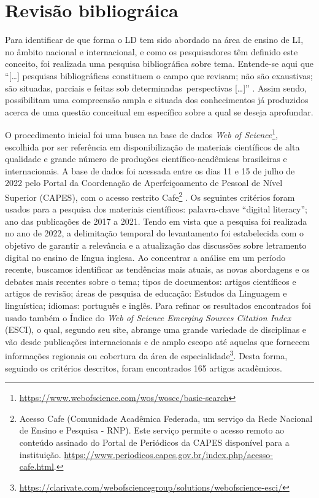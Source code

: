 \section{Revisão bibliográica}\label{sec-revisãobibliográfica}

Para identificar de que forma o LD tem sido abordado na área de ensino
de LI, no âmbito nacional e internacional, e como os pesquisadores têm
definido este conceito, foi realizada uma pesquisa bibliográfica sobre
tema. Entende-se aqui que ``{[}\ldots{]} pesquisas bibliográficas
constituem o campo que revisam; não são exaustivas; são situadas,
parciais e feitas sob determinadas~perspectivas {[}\ldots{]}'' \cite[p.~52]{reis2008pesquisa}. Assim sendo, possibilitam uma compreensão ampla e situada dos
conhecimentos já produzidos acerca de uma questão conceitual em
específico sobre a qual se deseja aprofundar.

O procedimento inicial foi uma busca na base de dados \emph{Web of
Science}\footnote{\url{https://www.webofscience.com/wos/woscc/basic-search}},
escolhida por ser referência em disponibilização de materiais
científicos de alta qualidade e grande número de produções
científico-acadêmicas brasileiras e internacionais. A base de dados foi
acessada entre os dias 11 e 15 de julho de 2022 pelo Portal da
Coordenação de Aperfeiçoamento de Pessoal de Nível Superior (CAPES), com
o acesso restrito Cafe\footnote{Acesso Cafe (Comunidade Acadêmica
  Federada, um serviço da Rede Nacional de Ensino e Pesquisa - RNP).
  Este serviço permite o acesso remoto ao conteúdo assinado do Portal de
  Periódicos da CAPES disponível para a instituição.
  \url{https://www.periodicos.capes.gov.br/index.php/acesso-cafe.html}.} . Os
seguintes critérios foram usados para a pesquisa dos materiais
científicos: palavra-chave ``digital literacy''; ano das publicações de
2017 a 2021. Tendo em vista que a pesquisa foi realizada no ano de 2022,
a delimitação temporal do levantamento foi estabelecida com o objetivo
de garantir a relevância e a atualização das discussões sobre letramento
digital no ensino de língua inglesa. Ao concentrar a análise em um
período recente, buscamos identificar as tendências mais atuais, as
novas abordagens e os debates mais recentes sobre o tema; tipos de
documentos: artigos científicos e artigos de revisão; áreas de pesquisa
de educação: Estudos da Linguagem e linguística; idiomas: português e
inglês. Para refinar os resultados encontrados foi usado também o Índice
do \emph{Web of Science Emerging Sources Citation Index} (ESCI), o qual,
segundo seu site, abrange uma grande variedade de disciplinas e vão
desde publicações internacionais e de amplo escopo até aquelas que
fornecem informações regionais ou cobertura da área de
especialidade\footnote{\url{https://clarivate.com/webofsciencegroup/solutions/webofscience-esci/}}.
Desta forma, seguindo os critérios descritos, foram encontrados 165
artigos acadêmicos.

